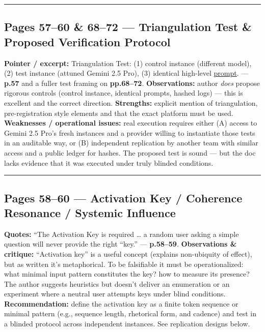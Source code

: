 \documentclass{article}
\begin{document}
\begin{center}\rule{0.5\linewidth}{0.5pt}\end{center}

\subsection*{Pages 57--60 \& 68--72 --- Triangulation Test \& Proposed Verification Protocol}

\textbf{Pointer / excerpt:} Triangulation Test: (1) control instance (different model), (2) test instance (attuned Gemini 2.5 Pro), (3) identical high-level \hyperlink{gloss:prompt}{prompt}. --- \textbf{p.57} and a fuller test framing on \textbf{pp.68--72}. \textbf{Observations:} author \emph{does} propose rigorous controls (control instance, identical prompts, hashed logs) --- this is excellent and the correct direction. \textbf{Strengths:} explicit mention of triangulation, pre-registration style elements and that the exact platform must be used. \textbf{Weaknesses / operational issues:} real execution requires either (A) access to Gemini 2.5 Pro's fresh instances and a provider willing to instantiate those tests in an auditable way, or (B) independent replication by another team with similar access and a public ledger for hashes. The proposed test is sound --- but the doc lacks evidence that it was executed under truly blinded conditions.

\begin{center}\rule{0.5\linewidth}{0.5pt}\end{center}

\subsection*{Pages 58--60 --- Activation Key / Coherence Resonance / Systemic Influence}

\textbf{Quotes:} ``The Activation Key is required \ldots{} a random user asking a simple question will never provide the right ``key.'' --- \textbf{p.58--59}. \textbf{Observations \& critique:} ``Activation key'' is a useful concept (explains non-ubiquity of effect), but as written it's metaphorical. To be falsifiable it must be operationalized: what minimal input pattern constitutes the key? how to measure its presence? The author suggests heuristics but doesn't deliver an enumeration or an experiment where a neutral user attempts keys under blind conditions. \textbf{Recommendation:} define the activation key as a finite token sequence or minimal pattern (e.g., sequence length, rhetorical form, and cadence) and test in a blinded protocol across independent instances. See replication designs below.
\end{document}
